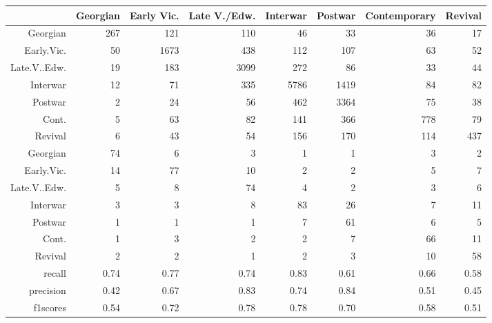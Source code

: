 \begin{table}[ht]
\centering
\begingroup\footnotesize
\begin{tabular}{rrrrrrrr}
  \toprule
 & Georgian & Early Vic. & Late V./Edw. & Interwar & Postwar & Contemporary & Revival \\ 
  \midrule
Georgian & 267 & 121 & 110 & 46 & 33 & 36 & 17 \\ 
  Early.Vic. & 50 & 1673 & 438 & 112 & 107 & 63 & 52 \\ 
  Late.V..Edw. & 19 & 183 & 3099 & 272 & 86 & 33 & 44 \\ 
  Interwar & 12 & 71 & 335 & 5786 & 1419 & 84 & 82 \\ 
  Postwar & 2 & 24 & 56 & 462 & 3364 & 75 & 38 \\ 
  Cont. & 5 & 63 & 82 & 141 & 366 & 778 & 79 \\ 
  Revival & 6 & 43 & 54 & 156 & 170 & 114 & 437 \\ 
  Georgian & 74 & 6 & 3 & 1 & 1 & 3 & 2 \\ 
  Early.Vic. & 14 & 77 & 10 & 2 & 2 & 5 & 7 \\ 
  Late.V..Edw. & 5 & 8 & 74 & 4 & 2 & 3 & 6 \\ 
  Interwar & 3 & 3 & 8 & 83 & 26 & 7 & 11 \\ 
  Postwar & 1 & 1 & 1 & 7 & 61 & 6 & 5 \\ 
  Cont. & 1 & 3 & 2 & 2 & 7 & 66 & 11 \\ 
  Revival & 2 & 2 & 1 & 2 & 3 & 10 & 58 \\ 
  recall & 0.74 & 0.77 & 0.74 & 0.83 & 0.61 & 0.66 & 0.58 \\ 
  precision & 0.42 & 0.67 & 0.83 & 0.74 & 0.84 & 0.51 & 0.45 \\ 
  f1scores & 0.54 & 0.72 & 0.78 & 0.78 & 0.70 & 0.58 & 0.51 \\ 
   \bottomrule
\end{tabular}
\endgroup
\end{table}
